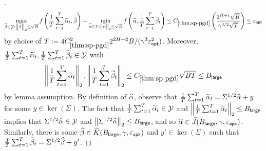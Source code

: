 \begin{proof}[]
\[\max_{\widetilde\beta\in\mathcal{Y}: \left \lVert \widetilde\beta \right \rVert_2 \leq \sqrt{B}} f\left(\frac{1}{T}\sum_{t=1}^T \widetilde\alpha_t, \widetilde\beta\right) - \min_{\widetilde\alpha\in\mathcal{Y}: \left \lVert \widetilde\alpha \right \rVert_2 \leq \sqrt{B}} f\left(\widetilde\alpha,\frac{1}{T}\sum_{t=1}^T \widetilde\beta_t\right) \leq C_{\ref{thm:sp-pgd}} \left(\frac{2^{H+1}\sqrt{B}}{\gamma^{3/2}\sqrt{T}}\right) \leq \varepsilon_{\mathsf{opt}}\] 
by choice of $T := 4C_{\ref{thm:sp-pgd}}^2 2^{2H+2} B/(\gamma^3 \varepsilon_{\mathsf{opt}}^2)$. Moreover, 
$\frac{1}{T}\sum_{t=1}^T \widetilde\alpha_t, \frac{1}{T}\sum_{t=1}^T \widetilde\beta_t \in \mathcal{Y}$ with \[\left \lVert \frac{1}{T}\sum_{t=1}^T \widetilde\alpha_t \right \rVert_2, \left \lVert \frac{1}{T}\sum_{t=1}^T \widetilde\beta_t \right \rVert_2 \leq C_{\ref{thm:sp-pgd}} \sqrt{BT} \leq B_{\mathsf{large}}\] by lemma assumption. By definition of $\widehat{\alpha}$, observe that $\frac{1}{T}\sum_{t=1}^T \widetilde\alpha_t = \Sigma^{1/2} \widehat{\alpha} + y$ for some $y \in \ker(\Sigma)$. The fact that $\frac{1}{T}\sum_{t=1}^T \widetilde\alpha_t \in \mathcal{Y}$ and $\left \lVert \frac{1}{T}\sum_{t=1}^T \widetilde\alpha_t \right \rVert_2 \leq B_{\mathsf{large}}$ implies that $\Sigma^{1/2} \widehat{\alpha} \in \mathcal{Y}$ and $\left \lVert \Sigma^{1/2}\widehat{\alpha} \right \rVert_2 \leq B_{\mathsf{large}}$, and so $\widehat{\alpha} \in \widehat{J}(B_{\mathsf{large}},\gamma,\varepsilon_{\mathsf{apx}})$. Similarly, there is some $\widehat{\beta} \in \widehat{K}(B_{\mathsf{large}},\gamma,\varepsilon_{\mathsf{apx}})$ and $y' \in \ker(\Sigma)$ such that $\frac{1}{T}\sum_{t=1}^T\widetilde\beta_t = \Sigma^{1/2} \widehat{\beta} + y'$.


\end{proof}
